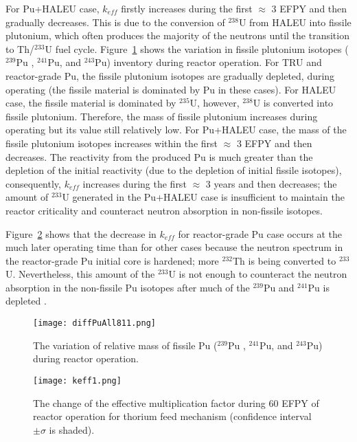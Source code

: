 For Pu+HALEU case, $k_{eff}$ firstly increases during the first $\approx$ $3$ EFPY and then gradually decreases. This is due to the conversion of $^{238}$U from HALEU into fissile plutonium, which often produces the majority of the neutrons until the transition to Th/$^{233}$U fuel cycle. Figure~\ref{fig:diffPuAll811} shows the variation in fissile plutonium isotopes ($^{239}$Pu , $^{241}$Pu, and $^{243}$Pu) inventory during reactor operation. For TRU and reactor-grade Pu, the fissile plutonium isotopes are gradually depleted, during operating (the fissile material is dominated by Pu in these cases). For HALEU case, the fissile material is dominated by $^{235}$U, however, $^{238}$U is converted into fissile plutonium. Therefore, the mass of fissile plutonium increases during operating but its value still relatively low. For Pu+HALEU case, the mass of the fissile plutonium isotopes increases within the first $\approx$ $3$ EFPY and then decreases. The reactivity from the produced Pu is much greater than the depletion of the initial reactivity (due to the depletion of initial fissile isotopes), consequently, $k_{eff}$ increases during the first $\approx$ $3$ years and then decreases; the amount of $^{233}$U generated in the Pu+HALEU case is insufficient to maintain the reactor criticality and counteract neutron absorption in non-fissile isotopes.

Figure~\ref{fig:keff1} shows that the decrease in $k_{eff}$ for reactor-grade Pu case occurs at the much later operating time than for other cases because the neutron spectrum in the reactor-grade Pu initial core is hardened; more $^{232}$Th is being converted to $^{233}$U. Nevertheless, this amount of the $^{233}$U is not enough to counteract the neutron absorption in the non-fissile Pu isotopes after much of the $^{239}$Pu and $^{241}$Pu is depleted \cite{betzler2016modeling}.

\begin{figure}
	\centering
	\texttt{[image: diffPuAll811.png]}
		\vspace{-0.5in}
	\caption{The variation of relative mass of fissile Pu ($^{239}$Pu , $^{241}$Pu, and $^{243}$Pu) during reactor operation.} 
	\label{fig:diffPuAll811}
\end{figure}

\begin{figure}
	\centering
	\texttt{[image: keff1.png]}
	\vspace{-0.5in}
	\caption{The change of the effective multiplication factor during 60 \gls{EFPY} of reactor operation for thorium feed mechanism (confidence interval $\pm\sigma$ is shaded).} 
	\label{fig:keff1}
\end{figure}

